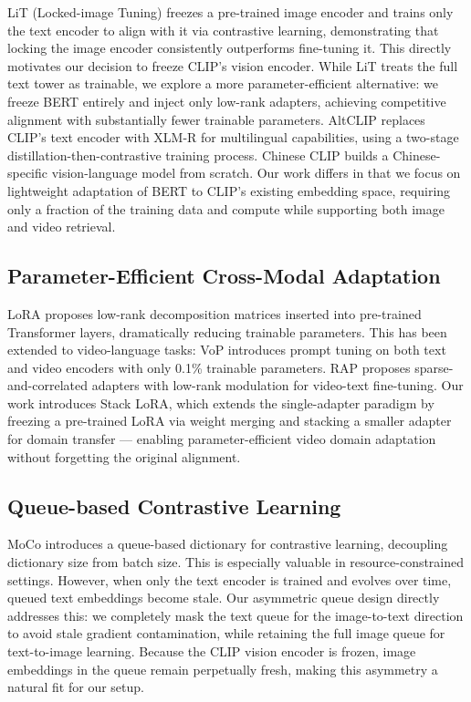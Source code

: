 \documentclass[10pt,leqno]{amsart}
\begin{document}
LiT \citep{zhai2022lit} (Locked-image Tuning) freezes a pre-trained image encoder and trains only the text encoder to align with it via contrastive learning, demonstrating that locking the image encoder consistently outperforms fine-tuning it. This directly motivates our decision to freeze CLIP's vision encoder. While LiT treats the full text tower as trainable, we explore a more parameter-efficient alternative: we freeze BERT entirely and inject only low-rank adapters, achieving competitive alignment with substantially fewer trainable parameters. AltCLIP \citep{chen2022altclip} replaces CLIP's text encoder with XLM-R for multilingual capabilities, using a two-stage distillation-then-contrastive training process. Chinese CLIP \citep{yang2022chinese} builds a Chinese-specific vision-language model from scratch. Our work differs in that we focus on lightweight adaptation of BERT to CLIP's existing embedding space, requiring only a fraction of the training data and compute while supporting both image and video retrieval.

\subsection{Parameter-Efficient Cross-Modal Adaptation}

LoRA \citep{hu2022lora} proposes low-rank decomposition matrices inserted into pre-trained Transformer layers, dramatically reducing trainable parameters. This has been extended to video-language tasks: VoP \citep{huang2023vop} introduces prompt tuning on both text and video encoders with only 0.1\% trainable parameters. RAP \citep{cao2024acl} proposes sparse-and-correlated adapters with low-rank modulation for video-text fine-tuning. Our work introduces Stack LoRA, which extends the single-adapter paradigm by freezing a pre-trained LoRA via weight merging and stacking a smaller adapter for domain transfer --- enabling parameter-efficient video domain adaptation without forgetting the original alignment.

\subsection{Queue-based Contrastive Learning}

MoCo \citep{he2020moco} introduces a queue-based dictionary for contrastive learning, decoupling dictionary size from batch size. This is especially valuable in resource-constrained settings. However, when only the text encoder is trained and evolves over time, queued text embeddings become stale. Our asymmetric queue design directly addresses this: we completely mask the text queue for the image-to-text direction to avoid stale gradient contamination, while retaining the full image queue for text-to-image learning. Because the CLIP vision encoder is frozen, image embeddings in the queue remain perpetually fresh, making this asymmetry a natural fit for our setup.
\end{document}
